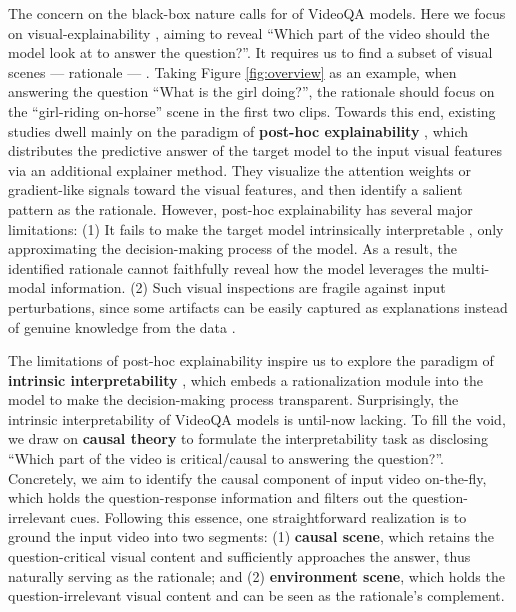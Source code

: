 The concern on the black-box nature calls for   of VideoQA models.
Here we focus on visual-explainability \cite{CSS,DBLP:conf/ijcai/RossHD17}, aiming to reveal ``Which part of the video should the model look at to answer the question?''.
It requires us to find a subset of visual scenes --- rationale ---  \cite{DBLP:conf/ijcai/RossHD17}.
Taking Figure \ref{fig:overview} as an example, when answering the question ``What is the girl doing?'', the rationale should focus on the ``girl-riding on-horse'' scene in the first two clips.
Towards this end, existing studies \cite{gao2018motionappearance,DBLP:conf/iccv/Liu0WL21,DBLP:conf/mm/WangG0W21} dwell mainly on the paradigm of \textbf{post-hoc explainability} \cite{LIME,DBLP:conf/iccv/SelvarajuCDVPB17}, which distributes the predictive answer of the target model to the input visual features via an additional explainer method.
They visualize the attention weights or gradient-like signals toward the visual features, and then identify a salient pattern as the rationale.
However, post-hoc explainability has several major limitations:
(1) It fails to make the target model intrinsically interpretable \cite{DBLP:conf/cvpr/YangZQ021,wang2021causal,DBLP:journals/natmi/Rudin19},  only approximating the decision-making process of the model.
As a result, the identified rationale cannot faithfully reveal how the model leverages the multi-modal information.
(2) Such visual inspections are fragile against input perturbations, since some artifacts can be easily captured as explanations instead of genuine knowledge from the data \cite{DBLP:conf/ijcai/LaugelLMRD19,slack2020fooling,heo2019fooling,ghorbani2019interpretation}.




The limitations of post-hoc explainability inspire us to explore the paradigm of \textbf{intrinsic interpretability} \cite{ghorbani2019interpretation,DBLP:journals/natmi/Rudin19}, which embeds a rationalization module into the model to make the decision-making process transparent.
Surprisingly, the intrinsic interpretability of VideoQA models is until-now lacking.
To fill the void, we draw on \textbf{causal theory} \cite{pearl2016causal,pearl2009causal} to formulate the interpretability task as disclosing ``Which part of the video is critical/causal to answering the question?''.
Concretely, we aim to identify the causal component of input video on-the-fly, which holds the question-response information and filters out the question-irrelevant cues.
Following this essence, one straightforward realization is to ground the input video into two segments:
(1) \textbf{causal scene}, which retains the question-critical visual content and sufficiently approaches the answer, thus naturally serving as the rationale;
and (2) \textbf{environment scene}, which holds the question-irrelevant visual content and can be seen as the rationale's complement.



